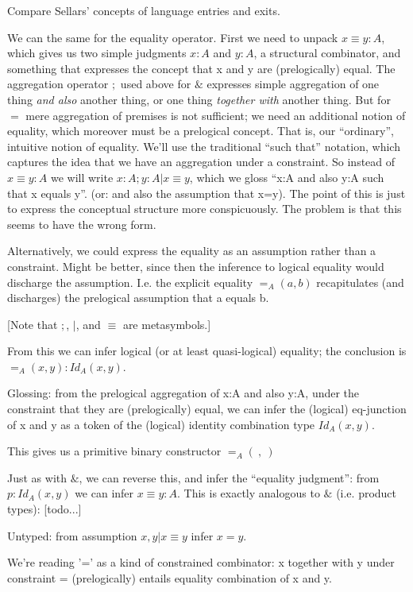 Compare Sellars' concepts of language entries and exits.

We can the same for the equality operator. First we need to unpack \(x
≡ y : A\), which gives us two simple judgments \(x:A\) and \(y:A\), a
structural combinator, and something that expresses the concept that x
and y are (prelogically) equal. The aggregation operator \(;\) used
above for \(\&\) expresses simple aggregation of one thing \textit{and
  also} another thing, or one thing \textit{together with} another thing.
But for \(=\) mere aggregation of premises is not sufficient; we need
an additional notion of equality, which moreover must be a prelogical
concept. That is, our ``ordinary'', intuitive notion of equality.
We'll use the traditional ``such that'' notation, which captures the
idea that we have an aggregation under a constraint. So instead of \(x
≡ y : A\) we will write \(x:A ; y:A | x≡y\), which we gloss ``x:A and
also y:A such that x equals y''. (or: and also the assumption that
x=y). The point of this is just to express the conceptual structure
more conspicuously. The problem is that this seems to have the wrong
form.

Alternatively, we could express the equality as an assumption rather
than a constraint. Might be better, since then the inference to
logical equality would discharge the assumption. I.e. the explicit
equality \( =_A(a,b) \) recapitulates (and discharges) the prelogical
assumption that a equals b.

[Note that \(;\), \(|\), and \(≡\) are metasymbols.]

From this we can infer logical (or at least quasi-logical) equality;
the conclusion is \( =_A(x,y) : Id_A(x,y) \).

Glossing: from the prelogical aggregation of x:A and also y:A, under
the constraint that they are (prelogically) equal, we can infer the
(logical) eq-junction of x and y as a token of the (logical) identity
combination type \(Id_A(x,y)\).

This gives us a primitive binary constructor \( =_A(\ ,\ ) \)

Just as with \(\&\), we can reverse this, and infer the ``equality
judgment'': from \( p: Id_A(x,y) \) we can infer \(x ≡ y : A\). This
is exactly analogous to \(\&\) (i.e. product types): [todo...]

Untyped:  from assumption \(x, y | x≡y \) infer \(x = y\).

We're reading '=' as a kind of constrained combinator: x together with
y under constraint = (prelogically) entails equality combination of x
and y.

